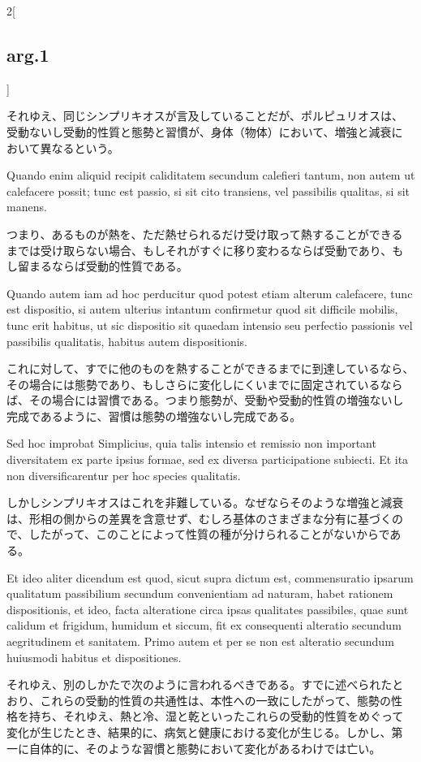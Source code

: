 \documentclass[paper=a4paper,fontsize=10pt,jafontsize=9pt,titlepage]{jlreq}
\begin{document}
\begin{paracol}{2}[\subsection{arg.1}]
\switchcolumn

それゆえ、同じシンプリキオスが言及していることだが、ポルピュリオスは、
受動ないし受動的性質と態勢と習慣が、身体（物体）において、増強と減衰に
おいて異なるという。

\switchcolumn*

Quando enim aliquid recipit
caliditatem secundum calefieri tantum, non autem ut calefacere possit;
tunc est passio, si sit cito transiens, vel passibilis qualitas, si
sit manens.

\switchcolumn

つまり、あるものが熱を、ただ熱せられるだけ受け取って熱することができる
までは受け取らない場合、もしそれがすぐに移り変わるならば受動であり、も
し留まるならば受動的性質である。

\switchcolumn*

Quando autem iam ad hoc perducitur quod potest etiam
alterum calefacere, tunc est dispositio, si autem ulterius intantum
confirmetur quod sit difficile mobilis, tunc erit habitus, ut sic
dispositio sit quaedam intensio seu perfectio passionis vel passibilis
qualitatis, habitus autem dispositionis.

\switchcolumn

これに対して、すでに他のものを熱することができるまでに到達しているなら、
その場合には態勢であり、もしさらに変化しにくいまでに固定されているなら
ば、その場合には習慣である。つまり態勢が、受動や受動的性質の増強ないし
完成であるように、習慣は態勢の増強ないし完成である。

\switchcolumn*

Sed hoc improbat Simplicius, quia talis intensio et remissio non
important diversitatem ex parte ipsius formae, sed ex diversa
participatione subiecti. Et ita non diversificarentur per hoc species
qualitatis.

\switchcolumn

しかしシンプリキオスはこれを非難している。なぜならそのような増強と減衰
は、形相の側からの差異を含意せず、むしろ基体のさまざまな分有に基づくの
で、したがって、このことによって性質の種が分けられることがないからであ
る。

\switchcolumn*

Et ideo aliter dicendum est quod, sicut supra dictum est,
commensuratio ipsarum qualitatum passibilium secundum convenientiam ad
naturam, habet rationem dispositionis, et ideo, facta alteratione
circa ipsas qualitates passibiles, quae sunt calidum et frigidum,
humidum et siccum, fit ex consequenti alteratio secundum aegritudinem
et sanitatem. Primo autem et per se non est alteratio secundum
huiusmodi habitus et dispositiones.

\switchcolumn

それゆえ、別のしかたで次のように言われるべきである。すでに述べられたと
おり、これらの受動的性質の共通性は、本性への一致にしたがって、態勢の性
格を持ち、それゆえ、熱と冷、湿と乾といったこれらの受動的性質をめぐって
変化が生じたとき、結果的に、病気と健康における変化が生じる。しかし、第
一に自体的に、そのような習慣と態勢において変化があるわけでは亡い。

\end{paracol}
\end{document}
